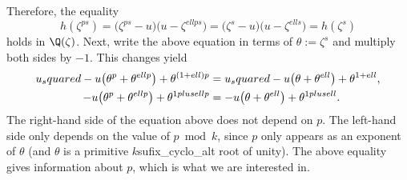 Therefore, the equality
\begin{equation*}
h(\zeta^{ps})=\big(\zeta^{ps}-{u}\big)\big({{u}}-\zeta^{{ell}ps}\big)=\big(\zeta^{s}-{u}\big)\big({{u}}-\zeta^{{ell}s}\big)=h(\zeta^{s})
\end{equation*}
holds in $\Q(\zeta)$. Next, write the above equation in terms of $\theta:=\zeta^{s}$ and multiply both sides by $-1$. This changes yield
\begin{align}
{u_squared}-{{u}}\big(\theta^{p}+\theta^{{ell}p}\big)+\theta^{(1+{ell})p}&={u_squared}-{{u}}\big(\theta+\theta^{{ell}}\big)+\theta^{1+{ell}}, \notag \\
-{u}\big(\theta^{p}+\theta^{{ell}p}\big)+\theta^{{1plusell}p}&=-{u}\big(\theta+\theta^{{ell}}\big)+\theta^{{1plusell}}\label{eq:equality_in_theta}.
\end{align}
The right-hand side of the equation above does not depend on $p$. The left-hand side only depends on the value of $p\bmod{{k}}$, since $p$ only appears as an exponent of $\theta$ (and $\theta$ is a primitive ${k}${sufix_cyclo_alt} root of unity). The above equality gives information about $p$, which is what we are interested in. 

